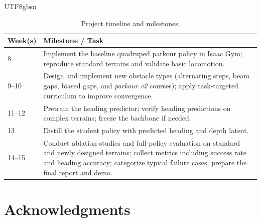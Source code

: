 \documentclass[conference]{IEEEtran}
\begin{document}
\begin{CJK}{UTF8}{gbsn}
\setlength{\parindent}{2em}
\begin{table}[H]
\centering
\caption{Project timeline and milestones.}
\label{tab:timeline}
\begin{tabular}{p{1.7cm}p{6.9cm}}
\toprule
\textbf{Week(s)} & \textbf{Milestone / Task} \\
\midrule
8 & Implement the baseline quadruped parkour policy in Isaac Gym; reproduce standard terrains and validate basic locomotion. \\
9--10 & Design and implement new obstacle types (alternating steps, beam gaps, biased gaps, and \textit{parkour v2} courses); apply task-targeted curriculum to improve convergence. \\
11--12 & Pretrain the heading predictor; verify heading predictions on complex terrains; freeze the backbone if needed. \\
13 & Distill the student policy with predicted heading and depth latent. \\
14--15 & Conduct ablation studies and full-policy evaluation on standard and newly designed terrains; collect metrics including success rate and heading accuracy; categorize typical failure cases; prepare the final report and demo. \\
\bottomrule
\end{tabular}
\end{table}
\section*{Acknowledgments}





\end{CJK}
\end{document}
